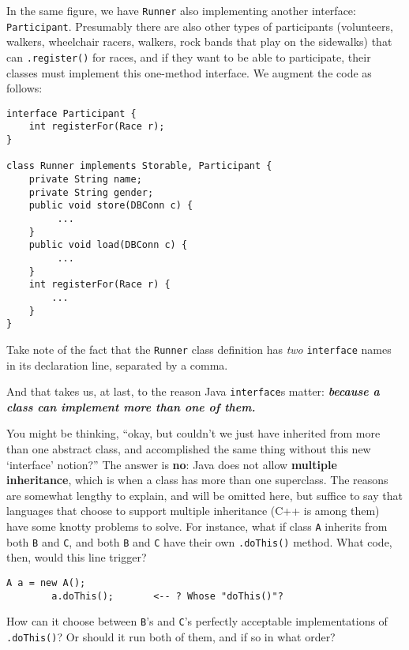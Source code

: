 In the same figure, we have \texttt{Runner} also implementing another
interface: \texttt{Participant}. Presumably there are also other types of
participants (volunteers, walkers, wheelchair racers, walkers, rock bands that
play on the sidewalks) that can \texttt{.register()} for races, and if they
want to be able to participate, their classes must implement this one-method
interface. We augment the code as follows:

\begin{Verbatim}[fontsize=\scriptsize,samepage=true,frame=single]
interface Participant {
    int registerFor(Race r);
}

class Runner implements Storable, Participant {                        
    private String name;
    private String gender;
    public void store(DBConn c) {
         ...
    }
    public void load(DBConn c) {
         ...
    }
    int registerFor(Race r) {
        ...
    }
}                                            
\end{Verbatim}

Take note of the fact that the \texttt{Runner} class definition has
\textit{two} \texttt{interface} names in its declaration line, separated by a
comma. 

And that takes us, at last, to the reason Java \texttt{interface}s matter:
\textbf{\textit{because a class can implement more than one of them.}}

You might be thinking, ``okay, but couldn't we just have inherited from more
than one abstract class, and accomplished the same thing without this new
`interface' notion?'' The answer is \textbf{no}: Java does not allow
\textbf{multiple inheritance}, which is when a class has more than one
superclass. The reasons are somewhat lengthy to explain, and will be omitted
here, but suffice to say that languages that choose to support multiple
inheritance (C++ is among them) have some knotty problems to solve. For
instance, what if class \texttt{A} inherits from both \texttt{B} and
\texttt{C}, and both \texttt{B} and \texttt{C} have their own
\texttt{.doThis()} method. What code, then, would this line trigger?

\begin{Verbatim}[fontsize=\small,samepage=true]
        A a = new A();
        a.doThis();       <-- ? Whose "doThis()"?
\end{Verbatim}

How can it choose between \texttt{B}'s and \texttt{C}'s perfectly acceptable
implementations of \texttt{.doThis()}? Or should it run both of them, and if
so in what order?

